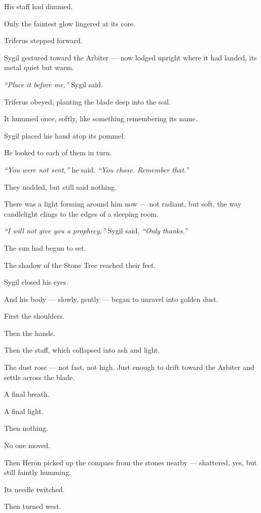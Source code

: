 \documentclass[12pt]{article}
\begin{document}
His staff had dimmed.

Only the faintest glow lingered at its core.

\bigskip

Triferus stepped forward.

Sygil gestured toward the Arbiter — now lodged upright where it had landed, its metal quiet but warm.

\textit{“Place it before me,”} Sygil said.

Triferus obeyed, planting the blade deep into the soil.

It hummed once, softly, like something remembering its name.

Sygil placed his hand atop its pommel.

He looked to each of them in turn.

\textit{“You were not sent,”} he said. \textit{“You chose. Remember that.”}

They nodded, but still said nothing.

There was a light forming around him now — not radiant, but soft, the way candlelight clings to the edges of a sleeping room.

\textit{“I will not give you a prophecy,”} Sygil said. \textit{“Only thanks.”}

\bigskip

The sun had begun to set.

The shadow of the Stone Tree reached their feet.

Sygil closed his eyes.

And his body — slowly, gently — began to unravel into golden dust.

First the shoulders.

Then the hands.

Then the staff, which collapsed into ash and light.

The dust rose — not fast, not high. Just enough to drift toward the Arbiter and settle across the blade.

A final breath.

A final light.

Then nothing.

\bigskip

No one moved.

Then Heron picked up the compass from the stones nearby — shattered, yes, but still faintly humming.

Its needle twitched.

Then turned west.
\end{document}
